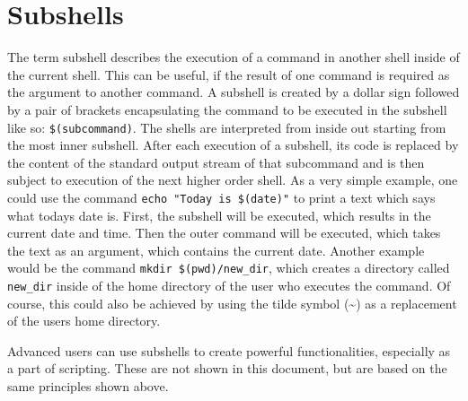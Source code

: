 \section{Subshells}

The term subshell describes the execution of a command in another shell inside of the current shell. This can be useful, if the result of one command is required as the argument to another command. A subshell is created by a dollar sign followed by a pair of brackets encapsulating the command to be executed in the subshell like so: \lstinline{$(subcommand)}. The shells are interpreted from inside out starting from the most inner subshell. After each execution of a subshell, its code is replaced by the content of the standard output stream of that subcommand and is then subject to execution of the next higher order shell. As a very simple example, one could use the command \lstinline{echo "Today is $(date)"} to print a text which says what todays date is. First, the subshell will be executed, which results in the current date and time. Then the outer command will be executed, which takes the text as an argument, which contains the current date. Another example would be the command \lstinline{mkdir $(pwd)/new_dir}, which creates a directory called \lstinline{new_dir} inside of the home directory of the user who executes the command. Of course, this could also be achieved by using the tilde symbol (\textasciitilde) as a replacement of the users home directory.

Advanced users can use subshells to create powerful functionalities, especially as a part of scripting. These are not shown in this document, but are based on the same principles shown above.